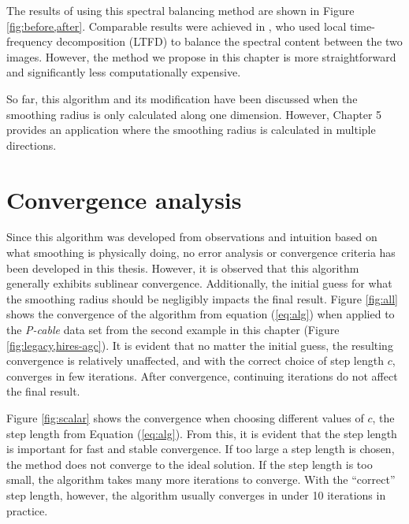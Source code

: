 
        The results of using this spectral balancing method are shown in Figure \ref{fig:before,after}. 
        Comparable results were achieved in \cite{ltft}, who used local time-frequency decomposition (LTFD) to balance the spectral content between the two images. 
        However, the method we propose in this chapter is more straightforward and significantly less computationally expensive.

        So far, this algorithm and its modification have been discussed when the smoothing radius is only calculated along one dimension. 
        However, Chapter 5 provides an application where the smoothing radius is calculated in multiple directions.

        
\section{Convergence analysis}
        Since this algorithm was developed from observations and intuition based on what smoothing is physically doing, no error analysis or convergence criteria has been developed in this thesis.
        However, it is observed that this algorithm generally exhibits sublinear convergence.
        Additionally, the initial guess for what the smoothing radius should be negligibly impacts the final result.
        Figure \ref{fig:all} shows the convergence of the algorithm from equation (\ref{eq:alg}) when applied to the {\em P-cable} data set from the second example in this chapter (Figure \ref{fig:legacy,hires-agc}).
        It is evident that no matter the initial guess, the resulting convergence is relatively unaffected, and with the correct choice of step length $c$, converges in few iterations.
        After convergence, continuing iterations do not affect the final result.

        Figure \ref{fig:scalar} shows the convergence when choosing different values of $c$, the step length from Equation (\ref{eq:alg}).
        From this, it is evident that the step length is important for fast and stable convergence. 
        If too large a step length is chosen, the method does not converge to the ideal solution.
        If the step length is too small, the algorithm takes many more iterations to converge.
        With the ``correct'' step length, however, the algorithm usually converges in under 10 iterations in practice.

